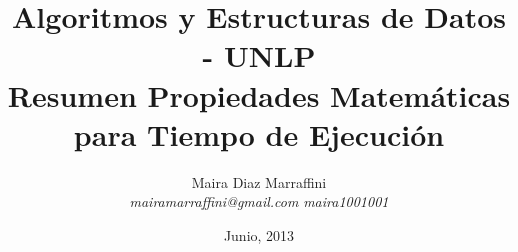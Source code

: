 \title{\Huge \textbf{Algoritmos y Estructuras de Datos - UNLP}  \\ Resumen Propiedades Matemáticas para Tiempo de Ejecución}

\author{Maira Diaz Marraffini \\
\emph{mairamarraffini@gmail.com} 
\emph{\faGithub maira1001001} }

\date{Junio, 2013}